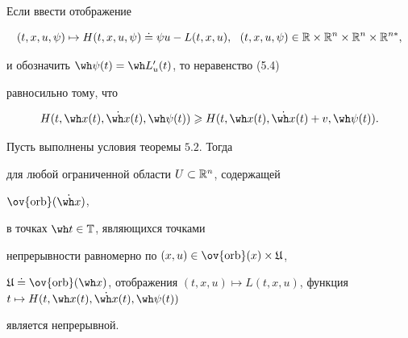 \begin{notes}


Если ввести отображение


\begin{equation}


(t,x,u,\psi)\mapsto H(t,x,u,\psi)\doteq \psi u-L(t,x,u),


\ \ (t,x,u,\psi)\in\Bbb R\times\Bbb R^n\times\Bbb


R^n\times\Bbb R^{n*},


\end{equation}


и обозначить $\wh\psi(t)=\wh L'_{u}(t)$, то неравенство (5.4)


равносильно тому, что


\begin{equation}


H(t,\wh x(t),\Dot{\wh x}(t),\wh\psi(t))\geqslant


H(t,\wh x(t),\Dot{\wh x}(t)+v,\wh\psi(t)).


\end{equation}


\end{notes}





\begin{thms}


Пусть выполнены условия теоремы $5.2$. Тогда


для любой ограниченной области $U\subset\Bbb R^n$, содержащей


$\ov{\orb}(\Dot{\wh x})$,


в точках $\wh t\in\Bbb T$, являющихся точками


непрерывности равномерно по $(x,u)\in\ov{\orb}(x)\times\frak U$,


$\frak U\doteq \ov{\orb}({\wh x})$, отображения $(t,x,u)\mapsto


L(t,x,u)$, функция $t\mapsto H(t,\wh x(t),\Dot{\wh x}(t),\wh\psi(t))$


является непрерывной.


\end{thms}








